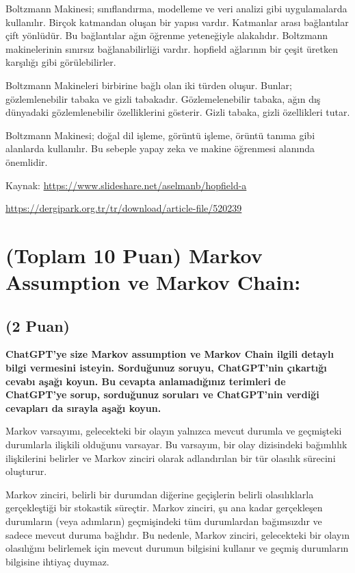 \documentclass[11pt]{article}
\begin{document}
    Boltzmann Makinesi; sınıflandırma, modelleme ve veri analizi gibi uygulamalarda kullanılır. Birçok katmandan oluşan bir yapısı vardır. Katmanlar arası bağlantılar çift yönlüdür. Bu bağlantılar ağın öğrenme yeteneğiyle alakalıdır. Boltzmann makinelerinin sınırsız bağlanabilirliği vardır. hopfield ağlarının bir çeşit üretken karşılığı gibi görülebilirler.

    Boltzmann Makineleri birbirine bağlı olan iki türden oluşur. Bunlar; gözlemlenebilir tabaka ve gizli tabakadır. Gözlemelenebilir tabaka, ağın dış dünyadaki gözlemlenebilir özelliklerini gösterir. Gizli tabaka, gizli özellikleri tutar.

    Boltzmann Makinesi; doğal dil işleme, görüntü işleme, örüntü tanıma gibi alanlarda kullanılır. Bu sebeple yapay zeka ve makine öğrenmesi alanında önemlidir.

Kaynak: \url{https://www.slideshare.net/aselmanb/hopfield-a}

        \url{https://dergipark.org.tr/tr/download/article-file/520239}

        
\section{(Toplam 10 Puan) Markov Assumption ve Markov Chain:}

\subsection{(2 Puan)} \textbf{ChatGPT’ye size Markov assumption ve Markov Chain ilgili detaylı bilgi vermesini isteyin. Sorduğunuz soruyu, ChatGPT'nin çıkartığı cevabı aşağı koyun. Bu cevapta anlamadığınız terimleri de ChatGPT’ye sorup, sorduğunuz soruları ve ChatGPT’nin verdiği cevapları da sırayla aşağı koyun.}

    Markov varsayımı, gelecekteki bir olayın yalnızca mevcut durumla ve geçmişteki durumlarla ilişkili olduğunu varsayar. Bu varsayım, bir olay dizisindeki bağımlılık ilişkilerini belirler ve Markov zinciri olarak adlandırılan bir tür olasılık sürecini oluşturur.

    Markov zinciri, belirli bir durumdan diğerine geçişlerin belirli olasılıklarla gerçekleştiği bir stokastik süreçtir. Markov zinciri, şu ana kadar gerçekleşen durumların (veya adımların) geçmişindeki tüm durumlardan bağımsızdır ve sadece mevcut duruma bağlıdır. Bu nedenle, Markov zinciri, gelecekteki bir olayın olasılığını belirlemek için mevcut durumun bilgisini kullanır ve geçmiş durumların bilgisine ihtiyaç duymaz.
\end{document}
